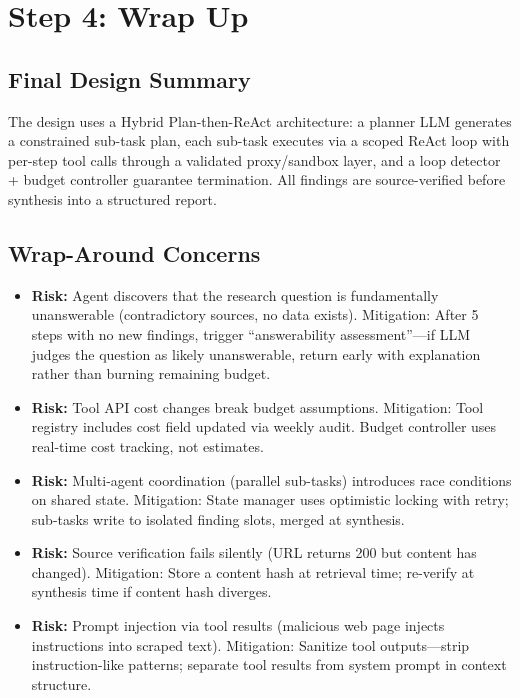 \section*{Step 4: Wrap Up}

\subsection*{Final Design Summary}

The design uses a Hybrid Plan-then-ReAct architecture: a planner LLM generates a constrained sub-task plan, each sub-task executes via a scoped ReAct loop with per-step tool calls through a validated proxy/sandbox layer, and a loop detector + budget controller guarantee termination. All findings are source-verified before synthesis into a structured report.

\subsection*{Wrap-Around Concerns}

\begin{itemize}
  \item \textbf{Risk:} Agent discovers that the research question is fundamentally unanswerable (contradictory sources, no data exists). Mitigation: After 5 steps with no new findings, trigger ``answerability assessment''---if LLM judges the question as likely unanswerable, return early with explanation rather than burning remaining budget.
  \item \textbf{Risk:} Tool API cost changes break budget assumptions. Mitigation: Tool registry includes cost field updated via weekly audit. Budget controller uses real-time cost tracking, not estimates.
  \item \textbf{Risk:} Multi-agent coordination (parallel sub-tasks) introduces race conditions on shared state. Mitigation: State manager uses optimistic locking with retry; sub-tasks write to isolated finding slots, merged at synthesis.
  \item \textbf{Risk:} Source verification fails silently (URL returns 200 but content has changed). Mitigation: Store a content hash at retrieval time; re-verify at synthesis time if content hash diverges.
  \item \textbf{Risk:} Prompt injection via tool results (malicious web page injects instructions into scraped text). Mitigation: Sanitize tool outputs---strip instruction-like patterns; separate tool results from system prompt in context structure.
\end{itemize}

